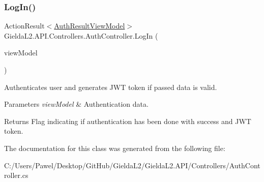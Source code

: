 \subsubsection{\texorpdfstring{LogIn()}{LogIn()}}
{\footnotesize\ttfamily Action\+Result$<$\mbox{\hyperlink{class_gielda_l2_1_1_a_p_i_1_1_view_models_1_1_view_1_1_auth_result_view_model}{Auth\+Result\+View\+Model}}$>$ Gielda\+L2.\+A\+P\+I.\+Controllers.\+Auth\+Controller.\+Log\+In (\begin{DoxyParamCaption}\item[{\mbox{\hyperlink{class_gielda_l2_1_1_a_p_i_1_1_view_models_1_1_view_1_1_log_in_view_model}{Log\+In\+View\+Model}}}]{view\+Model }\end{DoxyParamCaption})}



Authenticates user and generates J\+WT token if passed data is valid. 


\begin{DoxyParams}{Parameters}
{\em view\+Model} & Authentication data.\\
\hline
\end{DoxyParams}
\begin{DoxyReturn}{Returns}
Flag indicating if authentication has been done with success and J\+WT token.
\end{DoxyReturn}


The documentation for this class was generated from the following file\+:\begin{DoxyCompactItemize}
\item 
C\+:/\+Users/\+Pawel/\+Desktop/\+Git\+Hub/\+Gielda\+L2/\+Gielda\+L2.\+A\+P\+I/\+Controllers/Auth\+Controller.\+cs\end{DoxyCompactItemize}
